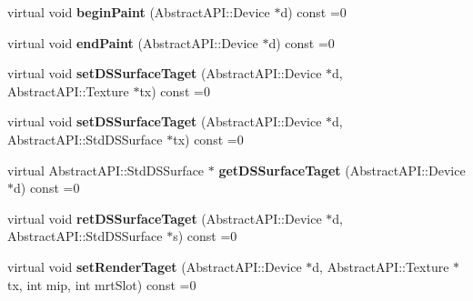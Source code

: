 \begin{DoxyCompactItemize}
\item 
\hypertarget{class_tempest_1_1_abstract_a_p_i_adfce57b87f21ddf5c862102c5602ad09}{virtual void {\bfseries begin\+Paint} (Abstract\+A\+P\+I\+::\+Device $\ast$d) const =0}\label{class_tempest_1_1_abstract_a_p_i_adfce57b87f21ddf5c862102c5602ad09}

\item 
\hypertarget{class_tempest_1_1_abstract_a_p_i_a68d5d0f28e19f399c4a50c002e7fe2e6}{virtual void {\bfseries end\+Paint} (Abstract\+A\+P\+I\+::\+Device $\ast$d) const =0}\label{class_tempest_1_1_abstract_a_p_i_a68d5d0f28e19f399c4a50c002e7fe2e6}

\item 
\hypertarget{class_tempest_1_1_abstract_a_p_i_a2a684662e079a18c988119c3f9d8189b}{virtual void {\bfseries set\+D\+S\+Surface\+Taget} (Abstract\+A\+P\+I\+::\+Device $\ast$d, Abstract\+A\+P\+I\+::\+Texture $\ast$tx) const =0}\label{class_tempest_1_1_abstract_a_p_i_a2a684662e079a18c988119c3f9d8189b}

\item 
\hypertarget{class_tempest_1_1_abstract_a_p_i_ade18acce678494f34261fb91c5853ade}{virtual void {\bfseries set\+D\+S\+Surface\+Taget} (Abstract\+A\+P\+I\+::\+Device $\ast$d, Abstract\+A\+P\+I\+::\+Std\+D\+S\+Surface $\ast$tx) const =0}\label{class_tempest_1_1_abstract_a_p_i_ade18acce678494f34261fb91c5853ade}

\item 
\hypertarget{class_tempest_1_1_abstract_a_p_i_acb7d27fd6be139ccd83e4081e8fce27c}{virtual Abstract\+A\+P\+I\+::\+Std\+D\+S\+Surface $\ast$ {\bfseries get\+D\+S\+Surface\+Taget} (Abstract\+A\+P\+I\+::\+Device $\ast$d) const =0}\label{class_tempest_1_1_abstract_a_p_i_acb7d27fd6be139ccd83e4081e8fce27c}

\item 
\hypertarget{class_tempest_1_1_abstract_a_p_i_af4c9d074d3436de39d211595c9f6b9fc}{virtual void {\bfseries ret\+D\+S\+Surface\+Taget} (Abstract\+A\+P\+I\+::\+Device $\ast$d, Abstract\+A\+P\+I\+::\+Std\+D\+S\+Surface $\ast$s) const =0}\label{class_tempest_1_1_abstract_a_p_i_af4c9d074d3436de39d211595c9f6b9fc}

\item 
\hypertarget{class_tempest_1_1_abstract_a_p_i_a04ddc3f1f6d11d899f6c86761978e633}{virtual void {\bfseries set\+Render\+Taget} (Abstract\+A\+P\+I\+::\+Device $\ast$d, Abstract\+A\+P\+I\+::\+Texture $\ast$tx, int mip, int mrt\+Slot) const =0}\label{class_tempest_1_1_abstract_a_p_i_a04ddc3f1f6d11d899f6c86761978e633}


\end{DoxyCompactItemize}

